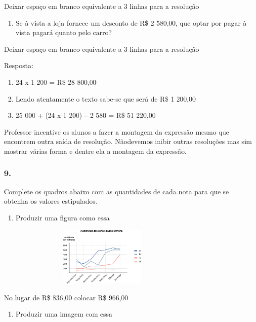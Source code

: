 Deixar espaço em branco equivalente a 3 linhas para a resolução

\begin{enumerate}
\def\labelenumi{\alph{enumi})}
\item
  Se à vista a loja fornece um desconto de R\$ 2 580,00, que optar por
  pagar à vista pagará quanto pelo carro?
\end{enumerate}

Deixar espaço em branco equivalente a 3 linhas para a resolução

Resposta:

\begin{enumerate}
\def\labelenumi{\alph{enumi})}
\item
  24 x 1 200 = R\$ 28 800,00
\item
  Lendo atentamente o texto sabe-se que será de R\$ 1 200,00
\item
  25 000 + (24 x 1 200) -- 2 580 = R\$ 51 220,00
\end{enumerate}

Professor incentive os alunos a fazer a montagem da expressão mesmo que
encontrem outra saída de resolução. Nãodevemos inibir outras resoluções
mas sim mostrar várias forma e dentre ela a montagem da expressão.

\subsubsection{9.}\label{section-88}

Complete os quadros abaixo com as quantidades de cada nota para que se
obtenha os valores estipulados.

\begin{enumerate}
\def\labelenumi{\alph{enumi})}
\item
  Produzir uma figura como essa
\end{enumerate}

\includegraphics[width=4.14203in,height=1.14177in]{media/image77.png}

No lugar de R\$ 836,00 colocar R\$ 966,00

\begin{enumerate}
\def\labelenumi{\alph{enumi})}
\item
  Produzir uma imagem com essa
\end{enumerate}


